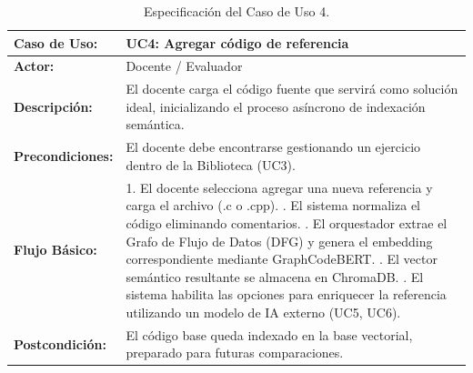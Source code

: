 \begin{table}[H]
	\centering
	\begin{tabular}{|p{3cm}|p{11cm}|}
		\hline
		\rowcolor[HTML]{E7F3FF}
		\textbf{Caso de Uso:}    & \textbf{UC4: Agregar código de referencia}                                                                                     \\ \hline
		\textbf{Actor:}          & Docente / Evaluador                                                                                                            \\ \hline
		\textbf{Descripción:}    & El docente carga el código fuente que servirá como solución ideal, inicializando el proceso asíncrono de indexación semántica. \\ \hline
		\textbf{Precondiciones:} & El docente debe encontrarse gestionando un ejercicio dentro de la Biblioteca (UC3).                                            \\ \hline
		\textbf{Flujo Básico:}   &
		1. El docente selecciona agregar una nueva referencia y carga el archivo (.c o .cpp). \newline
		2. El sistema normaliza el código eliminando comentarios. \newline
		3. El orquestador extrae el Grafo de Flujo de Datos (DFG) y genera el embedding correspondiente mediante GraphCodeBERT. \newline
		4. El vector semántico resultante se almacena en ChromaDB. \newline
		5. El sistema habilita las opciones para enriquecer la referencia utilizando un modelo de IA externo (UC5, UC6).                                          \\ \hline
		\textbf{Postcondición:}  & El código base queda indexado en la base vectorial, preparado para futuras comparaciones.                                      \\ \hline
	\end{tabular}
	\caption{Especificación del Caso de Uso 4.}
\end{table}

